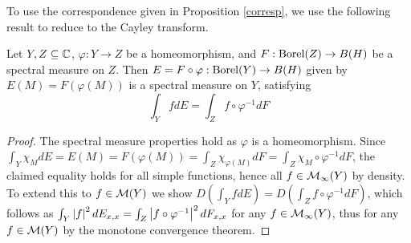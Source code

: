 \documentclass[10pt]{amsart}
\begin{document}
To use the correspondence given in Proposition \ref{corresp}, we use the following result to reduce to the Cayley transform.
\begin{lemma}
    Let $Y, Z \subseteq \mathbb{C}$, $\varphi : Y \to Z$ be a homeomorphism, and $F : \operatorname{Borel}(Z) \to B(H)$ be a spectral measure on $Z$. Then $E = F \circ \varphi : \operatorname{Borel}(Y) \to B(H)$ given by $E(M) = F(\varphi(M))$ is a spectral measure on $Y$, satisfying
    $$
        \int_Y fdE = \int_Z f \circ \varphi^{-1}dF
    $$
\end{lemma}
\begin{proof}
    The spectral measure properties hold as $\varphi$ is a homeomorphism. Since $\int_Y \chi_M dE = E(M) = F(\varphi(M)) = \int_Z \chi_{\varphi(M)} dF = \int_Z \chi_M \circ \varphi^{-1} dF$, the claimed equality holds for all simple functions, hence all $f \in \mathcal{M}_\infty(Y)$ by density. To extend this to $f \in \mathcal{M}(Y)$ we show $D(\int_Y f dE) = D(\int_Z f \circ \varphi^{-1} dF)$, which follows as $\int_Y \left| f \right|^2 dE_{x, x} = \int_Z \left| f \circ \varphi^{-1} \right|^2 dF_{x, x}$ for any $f \in \mathcal{M}_\infty(Y)$, thus for any $f \in \mathcal{M}(Y)$ by the monotone convergence theorem.
\end{proof}


\end{document}
